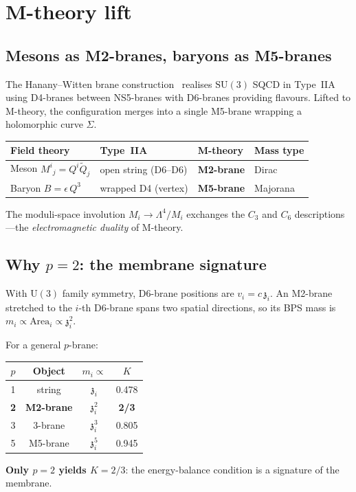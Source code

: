 \documentclass[12pt,a4paper]{article}
\newcommand{\SU}{\mathrm{SU}}
\newcommand{\UU}{\mathrm{U}}
\newcommand{\zch}{\mathfrak{z}}
\begin{document}
\section{M-theory lift}
\label{sec:Mtheory}

\subsection{Mesons as M2-branes, baryons as M5-branes}

The Hanany--Witten brane construction~\cite{HananyWitten:1997}
realises $\SU(3)$ SQCD in Type~IIA using D4-branes between
NS5-branes with D6-branes providing flavours.
Lifted to M-theory, the configuration merges into a single
M5-brane wrapping a holomorphic curve $\Sigma$.

\begin{center}
\begin{tabular}{llll}
\toprule
Field theory & Type~IIA & M-theory & Mass type \\
\midrule
Meson $M^i{}_j = Q^i\tilde{Q}_j$ &
  open string (D6--D6) &
  \textbf{M2-brane} & Dirac \\
Baryon $B = \epsilon\,Q^3$ &
  wrapped D4 (vertex) &
  \textbf{M5-brane} & Majorana \\
\bottomrule
\end{tabular}
\end{center}

The moduli-space involution
$M_i \to \Lambda^4/M_i$ exchanges the $C_3$ and $C_6$
descriptions---the \emph{electromagnetic duality} of M-theory.

\subsection{Why $p = 2$: the membrane signature}

With $\UU(3)$ family symmetry, D6-brane positions are
$v_i = c\,\zch_i$.
An M2-brane stretched to the $i$-th D6-brane spans two
spatial directions, so its BPS mass is
$m_i \propto \text{Area}_i \propto \zch_i^2$.

For a general $p$-brane:
\begin{center}
\begin{tabular}{cccc}
\toprule
$p$ & Object & $m_i \propto$ & $K$ \\
\midrule
1 & string & $\zch_i$ & 0.478 \\
\textbf{2} & \textbf{M2-brane} & $\zch_i^2$ & \textbf{2/3} \\
3 & 3-brane & $\zch_i^3$ & 0.805 \\
5 & M5-brane & $\zch_i^5$ & 0.945 \\
\bottomrule
\end{tabular}
\end{center}
\textbf{Only $p = 2$ yields $K = 2/3$}: the energy-balance
condition is a signature of the membrane.
\end{document}
